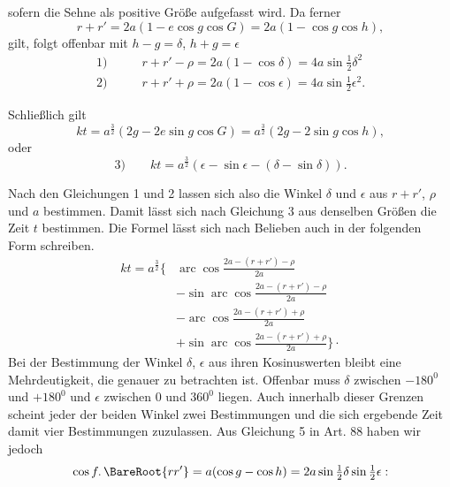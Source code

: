 \noindent sofern die Sehne als positive Größe aufgefasst wird. Da ferner
\[
r+r'=2a(1-e\cos g\cos G)=2a(1-\cos g\cos h),
\]
\noindent gilt, folgt offenbar mit $h-g=\delta$, $h+g=\epsilon$
\[
\begin{aligned}
\mathrm{1)}\qquad&r+r'-\rho=2a(1-\cos\delta)=4a\sin\tfrac12\delta^2\\[.6em]
\mathrm{2)}\qquad&r+r'+\rho=2a(1-\cos\epsilon)=4a\sin\tfrac12\epsilon^2.
\end{aligned}
\]
\par
Schließlich gilt
\[
kt=a^{\frac32}(2g-2e\sin g\cos G)=a^{\frac32}(2g-2\sin g\cos h),
\]
\noindent{}oder
\[
\mathrm{3)}\qquad kt=a^{\frac32}(\epsilon-\sin\epsilon-(\delta-\sin\delta)).
\]
\par
Nach den Gleichungen 1 und 2 lassen sich also die Winkel $\delta$ und $\epsilon$ aus $r+r'$, $\rho$ und $a$ bestimmen. Damit lässt sich nach Gleichung 3 aus denselben Größen die Zeit $t$ bestimmen. Die Formel lässt sich nach Belieben auch in der folgenden Form schreiben.
\[
\begin{aligned}
kt=a^{\frac32}\Biggl\{&\operatorname{arc}\cos\frac{2a-(r+r')-\rho}{2a}\\[.6em]
&-\sin\operatorname{arc}\cos\frac{2a-(r+r')-\rho}{2a}\\[.6em]
&-\operatorname{arc}\cos\frac{2a-(r+r')+\rho}{2a}\\[.6em]
&+\sin\operatorname{arc}\cos\frac{2a-(r+r')+\rho}{2a}\Biggr\}\mathpunct{\cdot}
\end{aligned}
\]
\noindent Bei der Bestimmung der Winkel $\delta$, $\epsilon$ aus ihren Kosinuswerten bleibt eine Mehrdeutigkeit, die genauer zu betrachten ist. Offenbar muss $\delta$ zwischen $-180^0$ und $+180^0$ und $\epsilon$ zwischen 0 und $360^0$ liegen. Auch innerhalb dieser Grenzen scheint jeder der beiden Winkel zwei Bestimmungen und die sich ergebende Zeit damit vier Bestimmungen zuzulassen. Aus Gleichung 5 in Art. 88 haben wir jedoch
\[
\cos f\mathpunct{.}\BareRoot{rr'}=a(\cos g-\cos h)=2a\sin\tfrac12\delta\sin\tfrac12\epsilon:
\]
